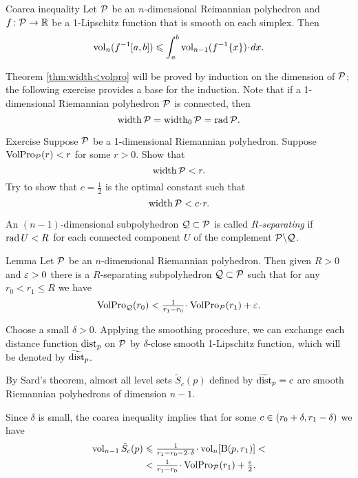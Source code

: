 \begin{thm}{Coarea inequality}
Let $\mathcal{P}$ be an $n$-dimensional Reimannian polyhedron and $f\colon\mathcal{P}\to \mathbb{R}$ be a 1-Lipschitz function that is smooth on each simplex.
Then 
\[\vol_n (f^{-1}[a,b]) \le \int_a^b\vol_{n-1}(f^{-1}\{x\})\cdot dx.\]
\end{thm}

Theorem \ref{thm:width<volpro} will be proved by induction on the dimension of $\mathcal{P}$;
the following exercise provides a base for the induction.
Note that if a 1-dimensional Riemannian polyhedron $\mathcal{P}$ is connected, then 
\[\operatorname{\rm width}\nolimits\mathcal{P}=\operatorname{\rm width}\nolimits_0\mathcal{P}=\mathop{\rm rad}\nolimits\mathcal{P}.\]

\begin{thm}{Exercise}\label{ex:1D-case}
Suppose $\mathcal{P}$ be a 1-dimensional Riemannian polyhedron.
Suppose $\operatorname{\rm VolPro}\nolimits_{\mathcal{P}}(r)<r$ for some $r>0$.
Show that 
\[\operatorname{\rm width}\nolimits \mathcal{P}<r.\]
Try to show that $c=\tfrac 12$ is the optimal constant such that 
\[\width \spc{P}<c\cdot r.\]
\end{thm}


An $(n-1)$-dimensional subpolyhedron $\mathcal{Q}\subset\mathcal{P}$ is called \emph{$R$-separating} if $\mathop{\rm rad}\nolimits U<R$ for each connected component $U$ of the complement $\mathcal{P}\backslash \mathcal{Q}$.

\begin{thm}{Lemma}\label{lem:separating}
Let $\mathcal{P}$ be an $n$-dimensional Riemannian polyhedron.
Then given $R>0$ and $\varepsilon>0$ there is a $R$-separating subpolyhedron $\mathcal{Q}\subset\mathcal{P}$ such that for any $r_0<r_1\le R$ we have
\[\VolPro_{\spc{Q}}(r_0)< \tfrac1{r_1-r_0}\cdot \VolPro_{\spc{P}}(r_1)+\eps.\]

\end{thm}

Choose a small $\delta>0$.
Applying the smoothing procedure, we can exchange each distance function $\mathrm{dist}_p$ on $\mathcal{P}$ by $\delta$-close smooth 1-Lipschitz function, which will be denoted by $\widetilde {\mathrm{dist}}_p$.

By Sard's theorem, almost all level sets $\tilde S_c(p)$ defined by $\widetilde {\mathrm{dist}}_p=c$ are smooth Riemannian polyhedrons of dimension $n-1$.

Since $\delta$ is small, the coarea inequality implies that 
for some  $c\z\in(r_0+\delta, r_1-\delta)$ we have
\begin{align*}
\vol_{n-1}\tilde S_c(p)&\le \tfrac1{r_1-r_0-2\cdot\delta}\cdot\vol_n[\oBall(p,r_1)]<
\\
&<\tfrac1{r_1-r_0}\cdot \VolPro_{\spc{P}}(r_1)+\tfrac\eps2.
\end{align*}

